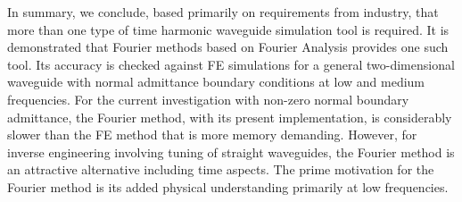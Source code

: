\documentclass[numreferences]{kluwer}
\begin{document}
In summary, we conclude, based primarily on requirements from
industry, that more than one type of time harmonic waveguide
simulation tool is required. It is demonstrated that Fourier
methods based on Fourier Analysis provides one such tool. Its accuracy
is checked against FE simulations for a general two-dimensional
waveguide with normal admittance boundary conditions at low and medium
frequencies. For the current investigation with non-zero normal
boundary admittance, the Fourier method, with its present
implementation, is considerably slower than the FE method that is more
memory demanding. However, for inverse engineering involving tuning of
straight waveguides, the Fourier method is an attractive
alternative including time aspects. The prime motivation for the
Fourier method is its added physical understanding primarily
at low frequencies.



\end{document}
